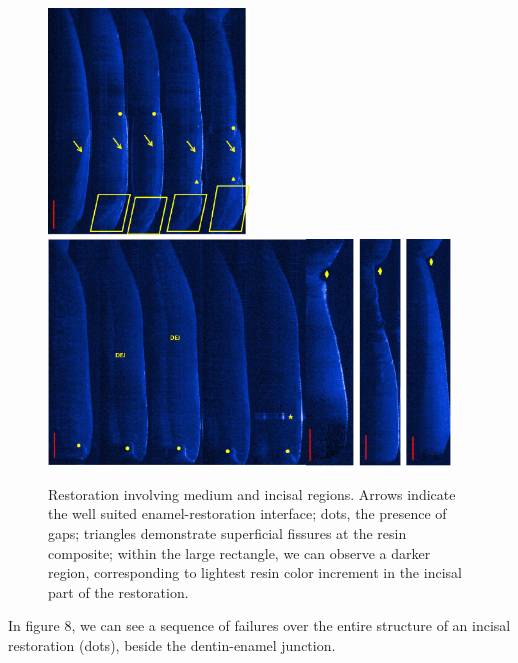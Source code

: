 \documentclass[12pt,twoside,english]{book}
\renewcommand{\~}{\perispomeni}%
\numberwithin{equation}{section}
\numberwithin{figure}{section}
\begin{document}
\begin{figure}[h]
\includegraphics[height=6cm]{claudiaFig7}\includegraphics[height=6cm]{claudiaFig8}\includegraphics[height=6cm]{claudiaFig9}\caption{Restoration involving medium and incisal regions. Arrows indicate the well suited enamel-restoration interface; dots, the presence of gaps; triangles demonstrate superficial fissures at the resin composite; within the large rectangle, we can observe a darker region, corresponding to lightest resin color increment in the incisal part of the restoration.} 
\end{figure}

In figure 8, we can see a sequence of failures over the entire structure of an incisal restoration (dots), beside the dentin-enamel junction.
\end{document}
